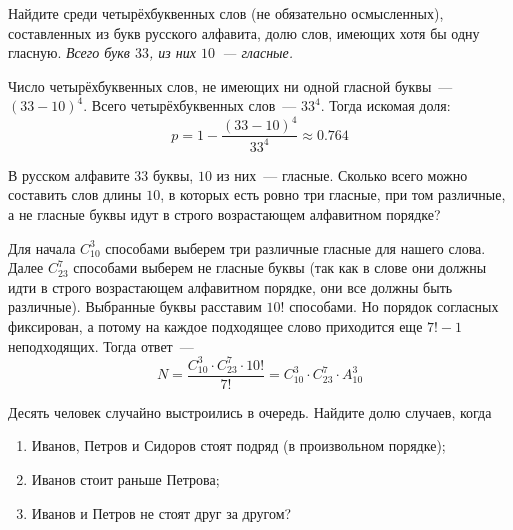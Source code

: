 \begin{Exercise}[counter=SecExercise, label={exercise:combinatorics:at_least_one_vowel}]
    \noindent
    Найдите среди четырёхбуквенных слов (не обязательно осмысленных), составленных из букв русского алфавита,
    долю слов, имеющих хотя бы одну гласную.
    \newline
    \textit{Всего букв $ 33 $, из них $ 10 $~--- гласные.}
\end{Exercise}

\begin{Answer}
    \noindent
    Число четырёхбуквенных слов, не имеющих ни одной гласной буквы~--- $ (33 - 10)^4 $.
    Всего четырёхбуквенных слов~--- $ 33^4 $.
    Тогда искомая доля:
    \[
        p = 1 - \frac{(33 - 10)^4}{33^4} \approx 0.764
    \]
\end{Answer}


\begin{Exercise}[counter=SecExercise]
    \noindent
    В русском алфавите $ 33 $ буквы, $ 10 $ из них~--- гласные.
    Сколько всего можно составить слов длины $ 10 $, в которых есть ровно три гласные, при том различные,
    а не гласные буквы идут в строго возрастающем алфавитном порядке?
\end{Exercise}

\begin{Answer}
    \noindent
    Для начала $ C_{10}^3 $ способами выберем три различные гласные для нашего слова.
    Далее $ C_{23}^7 $ способами выберем не гласные буквы
    (так как в слове они должны идти в строго возрастающем алфавитном порядке, они все должны быть различные).
    Выбранные буквы расставим $ 10! $ способами.
    Но порядок согласных фиксирован, а потому на каждое подходящее слово приходится еще $ 7! - 1 $ неподходящих.
    Тогда ответ~---
    \[
        N = \frac{C_{10}^3 \cdot C_{23}^7 \cdot 10!}{7!} = C_{10}^3 \cdot C_{23}^7 \cdot A_{10}^3
    \]
\end{Answer}


\begin{Exercise}[counter=SecExercise, label={exercise:combinatorics:queue}]
    \noindent
    Десять человек случайно выстроились в очередь.
    Найдите долю случаев, когда
    \begin{enumerate}[label=\textbf{\alph*)}]
        \item Иванов, Петров и Сидоров стоят подряд (в произвольном порядке);
        \item Иванов стоит раньше Петрова;
        \item Иванов и Петров не стоят друг за другом?
    \end{enumerate}
\end{Exercise}

